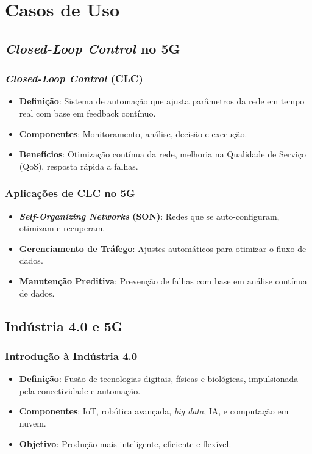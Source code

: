 
\section{Casos de Uso}
\subsection{\textit{Closed-Loop Control} no 5G}
\begin{frame}
    \frametitle{\textit{Closed-Loop Control} (CLC)}
    \begin{itemize}
        \item \textbf{Definição}: Sistema de automação que ajusta parâmetros da rede em tempo real com base em feedback contínuo.
        \item \textbf{Componentes}: Monitoramento, análise, decisão e execução.
        \item \textbf{Benefícios}: Otimização contínua da rede, melhoria na Qualidade de Serviço (QoS), resposta rápida a falhas.
    \end{itemize}
\end{frame}

\begin{frame}
    \frametitle{Aplicações de CLC no 5G}
    \begin{itemize}
        \item \textbf{\textit{Self-Organizing Networks} (SON)}: Redes que se auto-configuram, otimizam e recuperam.
        \item \textbf{Gerenciamento de Tráfego}: Ajustes automáticos para otimizar o fluxo de dados.
        \item \textbf{Manutenção Preditiva}: Prevenção de falhas com base em análise contínua de dados.
    \end{itemize}
\end{frame}

\subsection{Indústria 4.0 e 5G}
\begin{frame}
    \frametitle{Introdução à Indústria 4.0}
    \begin{itemize}
        \item \textbf{Definição}: Fusão de tecnologias digitais, físicas e biológicas, impulsionada pela conectividade e automação.
        \item \textbf{Componentes}: IoT, robótica avançada, \textit{big data}, IA, e computação em nuvem.
        \item \textbf{Objetivo}: Produção mais inteligente, eficiente e flexível.
    \end{itemize}
\end{frame}

